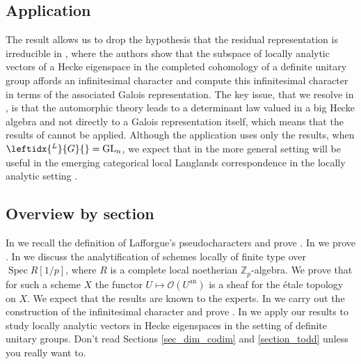 \documentclass{amsart}
\theoremstyle{definition}
\theoremstyle{remark}
\DeclareMathOperator{\GL}{GL}
\DeclareMathOperator{\Spec}{Spec}
\newcommand{\Zp}{\ZZ_p}
\newcommand{\ZZ}{\mathbb Z}
\newcommand{\OO}{\mathcal O}
\newcommand{\ana}{\mathrm{an}}
\newcommand{\LG}{\leftidx{^L}{G}{}}
\begin{document}
\subsection{Application}
The result allows us to drop the hypothesis 
that the residual representation is irreducible in \cite[Section 9.9]{DPS}, where the authors show  that the subspace of locally analytic vectors of a Hecke eigenspace
in the completed cohomology of a definite unitary group 
affords an infinitesimal character and compute this infinitesimal character 
in terms of the associated Galois representation. The key issue, that we resolve in , is that the automorphic theory leads to a determinant law valued in a big Hecke algebra and not directly to a Galois representation itself, 
which means that the results of \cite{DPS} cannot be  applied.
Although the application uses 
only the results, when $\LG=\GL_n$, we expect that  in the more general setting will 
be useful in the emerging categorical local Langlands correspondence in the locally analytic setting \cite[Section 6.2]{padic_LL}. 

\subsection{Overview by section} In  we recall the definition of Lafforgue's pseudocharacters and prove . In 
we prove . In  we discuss the analytification of schemes locally of finite type over $\Spec R[1/p]$, where $R$ is a complete local noetherian $\Zp$-algebra. We 
prove that for such a scheme $X$ the functor 
$U\mapsto \OO(U^{\ana})$ is a sheaf for the \'etale topology on $X$. We expect that the results are known to the experts. In  we carry out the construction of the infinitesimal character and prove . In  we apply our results to study 
locally analytic vectors in Hecke eigenspaces in the setting of definite unitary groups. Don't read Sections \ref{sec_dim_codim} and \ref{section_todd} unless you really want to. 
\end{document}
